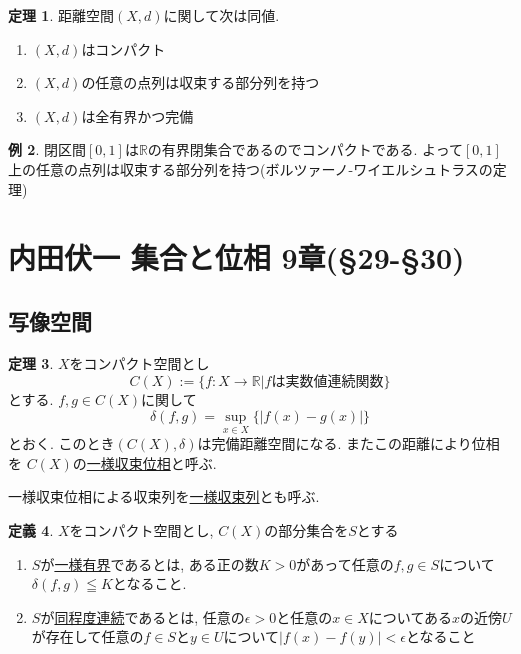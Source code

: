 \documentclass[dvipdfmx,a4paper,11pt]{article}
\newcommand{\R}{\mathbb{R}}
\theoremstyle{definition}
\newtheorem{thm}{定理}
\newtheorem{dfn}[thm]{定義}
\newtheorem{exa}[thm]{例}
\begin{document}
   \begin{tcolorbox}[
    colback = white,
    colframe = green!35!black,
    fonttitle = \bfseries,
    breakable = true]
    \begin{thm}
距離空間$(X,d)$に関して次は同値.
\begin{enumerate}
 \setlength{\parskip}{0cm} 
  \setlength{\itemsep}{0cm} 
\item $(X,d)$はコンパクト
\item $(X,d)$の任意の点列は収束する部分列を持つ
\item $(X,d)$は全有界かつ完備
\end{enumerate}
  \end{thm}
  \end{tcolorbox}
  
\begin{exa}
閉区間$[0,1]$は$\R$の有界閉集合であるのでコンパクトである. よって$[0,1]$上の任意の点列は収束する部分列を持つ(ボルツァーノ-ワイエルシュトラスの定理)
\end{exa}

\newpage
\section{内田伏一 集合と位相 9章(\S29-\S30)}

\subsection{写像空間}

   \begin{tcolorbox}[
    colback = white,
    colframe = green!35!black,
    fonttitle = \bfseries,
    breakable = true]
    \begin{thm}
$X$をコンパクト空間とし
$$
C(X) := \{ f : X \rightarrow \R | \text{$f$は実数値連続関数}\}
$$
とする. $f,g \in C(X)$に関して
$$
\delta(f,g)=\sup_{x \in X}\{ |f(x) - g(x)|\}
$$
とおく. このとき$(C(X), \delta)$は完備距離空間になる. またこの距離により位相を
$C(X)$の\underline{一様収束位相}と呼ぶ.
  \end{thm}
  \end{tcolorbox}
  一様収束位相による収束列を\underline{一様収束列}とも呼ぶ.

   \begin{tcolorbox}[
    colback = white,
    colframe = green!35!black,
    fonttitle = \bfseries,
    breakable = true]
    \begin{dfn}
  $X$をコンパクト空間とし, $C(X)$の部分集合を$S$とする
  \begin{enumerate}
  \item $S$が\underline{一様有界}であるとは, ある正の数$K>0$があって任意の$f,g \in S$について$\delta(f,g) \leqq K$となること.
  \item $S$が\underline{同程度連続}であるとは, 任意の$\epsilon>0$と任意の$x \in X$についてある$x$の近傍$U$が存在して任意の$f \in S$と$y \in U$について$|f(x)- f(y)| < \epsilon$となること
  \end{enumerate}
  \end{dfn}
  \end{tcolorbox}
  
\end{document}
